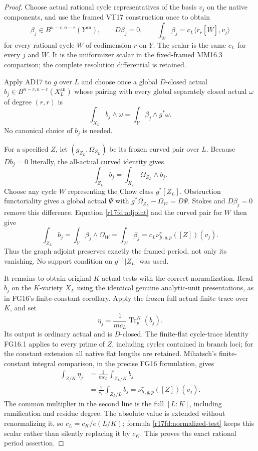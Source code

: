 \begin{proof}
Choose actual rational cycle representatives of the basis
$v_j$ on the native components, and use the framed VT17
construction once to obtain
\[
       \beta_j\in B^{n-r,n-r}(Y^{\mathrm{an}}),\qquad
       D\beta_j=0,
       \qquad
       \int_W\beta_j
         =c_L\langle r_r[\overline W],v_j\rangle
 \tag{FD17.6}\label{r17fd:vertical-values}
\]
for every rational cycle $W$ of codimension $r$ on $Y$.
The scalar is the same $c_L$ for every $j$ and $W$.
It is the uniformizer scalar in the fixed-framed MM16.3
comparison; the complete resolution differential is retained.

Apply AD17 to $g$ over $L$ and choose once a global
$D$-closed actual $b_j\in B^{n-r,n-r}(X_L^{\mathrm{an}})$
whose pairing with every global separately closed actual
$\omega$ of degree $(r,r)$ is
\[
             \int_{X_L}b_j\wedge\omega
                    =\int_Y\beta_j\wedge g^*\omega.
 \tag{FD17.7}\label{r17fd:adjoint}
\]
No canonical choice of $b_j$ is needed.

For a specified $Z$, let $(g_{Z_L},\Omega_{Z_L})$ be its
frozen curved pair over $L$. Because $Db_j=0$ literally,
the all-actual curved identity gives
\[
                \int_{Z_L}b_j
                     =\int_{X_L}\Omega_{Z_L}\wedge b_j.
\]
Choose any cycle $W$ representing the Chow class $g^*[Z_L]$.
Obstruction functoriality gives a global actual $\Psi$ with
$g^*\Omega_{Z_L}-\Omega_W=D\Psi$. Stokes and
$D\beta_j=0$ remove this difference. Equation
\eqref{r17fd:adjoint} and the curved pair for $W$ then give
\[
 \int_{Z_L}b_j
      =\int_Y\beta_j\wedge\Omega_W
      =\int_W\beta_j
      =c_L\nu_{\mathcal Y,g,p}^r([Z])(v_j).
 \tag{FD17.8}\label{r17fd:upstairs-period}
\]
Thus the graph adjoint preserves exactly the framed
period, not only its vanishing. No support condition on
$g^{-1}|Z_L|$ was used.

It remains to obtain original-$K$ actual tests with the
correct normalization. Read $b_j$ on the $K$-variety $X_L$
using the identical genuine analytic-unit presentations,
as in FG16's finite-constant corollary. Apply the frozen
full actual finite trace over $K$, and set
\[
          \eta_j=\frac{1}{m c_L}\operatorname{Tr}_{p}^{K}(b_j).
 \tag{FD17.9}\label{r17fd:normalized-test}
\]
Its output is ordinary actual and is $D$-closed. The
finite-flat cycle-trace identity FG16.1 applies to every
prime of $Z$, including cycles contained in branch loci;
for the constant extension all native flat lengths are
retained. Mihatsch's finite-constant integral comparison,
in the precise FG16 formulation, gives
\[
 \begin{split}
  \int_{Z/K}\eta_j
    &=\frac{1}{m c_L}\int_{Z_L/K}b_j\\
    &=\frac{1}{c_L}\int_{Z_L/L}b_j
     =\nu_{\mathcal Y,g,p}^r([Z])(v_j).
 \end{split}
 \tag{FD17.10}\label{r17fd:native-calibration}
\]
The common multiplier in the second line is the full
$[L:K]$, including ramification and residue degree. The
absolute value is extended without renormalizing it, so
$c_L=c_K/e(L/K)$; formula \eqref{r17fd:normalized-test}
keeps this scalar rather than silently replacing it by
$c_K$. This proves the exact rational period assertion.


\end{proof}
